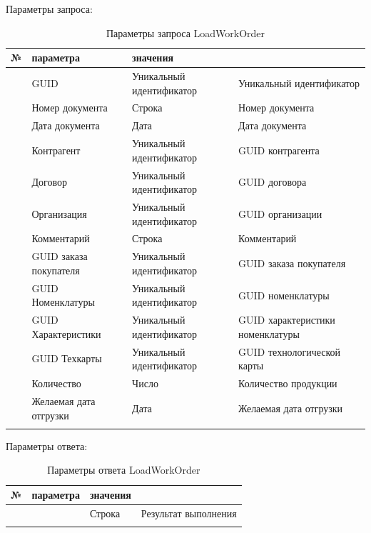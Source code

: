 Параметры запроса:
\pc
\scriptsize
\begin{longtable}{|p{10mm}|p{35mm}|p{40mm}|p{60mm}|}
\hline
\parbox[c][5mm]{10mm}{\centering№} & \parbox[c]{35mm}{ параметра} & \parbox[c]{40mm}{ значения} & \parbox[c]{60mm}{} \\
\hline
\parbox[c][5mm]{16mm}{\p} & GUID & Уникальный идентификатор & Уникальный идентификатор \\
\hline
\parbox[c][5mm]{11mm}{\p} & Номер документа & Строка & Номер документа \\
\hline
\parbox[c][5mm]{11mm}{\p} & Дата документа & Дата & Дата документа \\
\hline
\parbox[c][5mm]{11mm}{\p} & Контрагент & Уникальный идентификатор & GUID контрагента \\
\hline
\parbox[c][5mm]{11mm}{\p} & Договор & Уникальный идентификатор & GUID договора \\
\hline
\parbox[c][5mm]{11mm}{\p} & Организация & Уникальный идентификатор & GUID организации \\
\hline
\parbox[c][5mm]{11mm}{\p} & Комментарий & Строка & Комментарий \\
\hline
\parbox[c][5mm]{11mm}{\p} & GUID заказа покупателя & Уникальный идентификатор & GUID заказа покупателя \\
\hline
\parbox[c][5mm]{11mm}{\p} & GUID Номенклатуры & Уникальный идентификатор & GUID номенклатуры \\
\hline
\parbox[c][5mm]{11mm}{\p} & GUID Характеристики & Уникальный идентификатор & GUID характеристики номенклатуры \\
\hline
\parbox[c][5mm]{11mm}{\p} & GUID Техкарты & Уникальный идентификатор & GUID технологической карты \\
\hline
\parbox[c][5mm]{11mm}{\p} & Количество & Число & Количество продукции \\
\hline
\parbox[c][5mm]{11mm}{\p} & Желаемая дата отгрузки & Дата & Желаемая дата отгрузки \\
\hline
\caption{Параметры запроса LoadWorkOrder}\label{ex:in_LoadWorkOrder}
\end{longtable}  
\normalsize



 
Параметры ответа:
\pc
\scriptsize
\begin{longtable}{|p{10mm}|p{40mm}|p{20mm}|p{75mm}|}
\hline
\parbox[c][5mm]{10mm}{\centering№} & \parbox[c]{40mm}{ параметра} & \parbox[c]{20mm}{ значения} & \parbox[c]{75mm}{} \\
\hline
\parbox[c][5mm]{15mm}{\p} & \parbox[c]{30mm}{} & \parbox[c]{50mm}{Строка}  & \parbox[c]{75mm}{Результат выполнения} \\
\hline
\caption{Параметры ответа LoadWorkOrder}\label{ex:out_LoadWorkOrder}
\end{longtable}  
\normalsize







